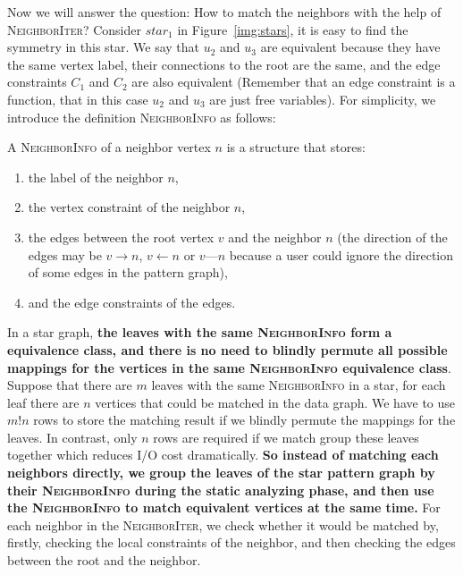 Now we will answer the question: How to match the neighbors with the help of \textsc{NeighborIter}?
Consider $star_1$ in Figure~\ref{img:stars}, it is easy to find the symmetry in this star.
We say that $u_2$ and $u_3$ are equivalent because they have the same vertex label,
their connections to the root are the same, and the edge constraints $C_1$ and $C_2$ are also equivalent
(Remember that an edge constraint is a function, that in this case $u_2$ and $u_3$ are just free variables).
For simplicity, we introduce the definition \textsc{NeighborInfo} as follows:
\begin{definition}[NeighborInfo]
  A \textsc{NeighborInfo} of a neighbor vertex $n$ is a structure that stores:
  \begin{enumerate}[noitemsep]
  \item the label of the neighbor $n$,
  \item the vertex constraint of the neighbor $n$,
  \item the edges between the root vertex $v$ and the neighbor $n$
    (the direction of the edges may be $v \rightarrow n$, $v \leftarrow n$ or $v \text{---} n$ because a user could ignore the direction of some edges in the pattern graph),
  \item and the edge constraints of the edges.
  \end{enumerate}
\end{definition}
In a star graph, \textbf{the leaves with the same \textsc{NeighborInfo} form a equivalence class,
and there is no need to blindly permute all possible mappings for the vertices in the same \textsc{NeighborInfo} equivalence class}.
Suppose that there are $m$ leaves with the same \textsc{NeighborInfo} in a star, for each leaf there are $n$ vertices that could be matched in the data graph.
We have to use $m!n$ rows to store the matching result if we blindly permute the mappings for the leaves.
In contrast, only $n$ rows are required if we match group these leaves together which reduces I/O cost dramatically.
\textbf{So instead of matching each neighbors directly, we group the leaves of the star pattern graph by their \textsc{NeighborInfo} during the static analyzing phase, and then use the \textsc{NeighborInfo} to match equivalent vertices at the same time.}
For each neighbor in the \textsc{NeighborIter}, we check whether it would be matched by,
firstly, checking the local constraints of the neighbor,
and then checking the edges between the root and the neighbor.

